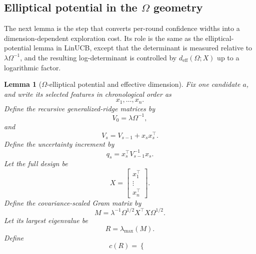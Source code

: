 \documentclass{article} %
\newtheorem{lemma}[theorem]{Lemma}
\begin{document}
\subsection{Elliptical potential in the \(\Omega\) geometry}

The next lemma is the step that converts per-round confidence widths into a dimension-dependent exploration cost.  Its role is the same as the elliptical-potential lemma in LinUCB, except that the determinant is measured relative to \(\lambda\Omega^{-1}\), and the resulting log-determinant is controlled by \(d_{\mathrm{eff}}(\Omega;X)\) up to a logarithmic factor.

\begin{lemma}[\(\Omega\)-elliptical potential and effective dimension]
\label{lem:hyper-elliptical}
Fix one candidate \(a\), and write its selected features in chronological order as
\begin{equation}
\label{eq:hyper-elliptical-features}
x_1,\ldots,x_n .
\end{equation}
Define the recursive generalized-ridge matrices by
\begin{equation}
\label{eq:hyper-elliptical-V0}
V_0=\lambda\Omega^{-1},
\end{equation}
and
\begin{equation}
\label{eq:hyper-elliptical-Vs}
V_s=V_{s-1}+x_sx_s^\top .
\end{equation}
Define the uncertainty increment by
\begin{equation}
\label{eq:hyper-elliptical-qs}
q_s=x_s^\top V_{s-1}^{-1}x_s .
\end{equation}
Let the full design be
\begin{equation}
\label{eq:hyper-elliptical-X}
X=
\begin{bmatrix}
x_1^\top\\
\vdots\\
x_n^\top
\end{bmatrix}.
\end{equation}
Define the covariance-scaled Gram matrix by
\begin{equation}
\label{eq:hyper-elliptical-M}
M=
\lambda^{-1}\Omega^{1/2}X^\top X\Omega^{1/2}.
\end{equation}
Let its largest eigenvalue be
\begin{equation}
\label{eq:hyper-elliptical-R}
R=\lambda_{\max}(M).
\end{equation}
Define
\begin{equation}
\label{eq:hyper-elliptical-cR}
c(R)=
\begin{cases}

\end{cases}
\end{equation}
\end{lemma}
\end{document}
